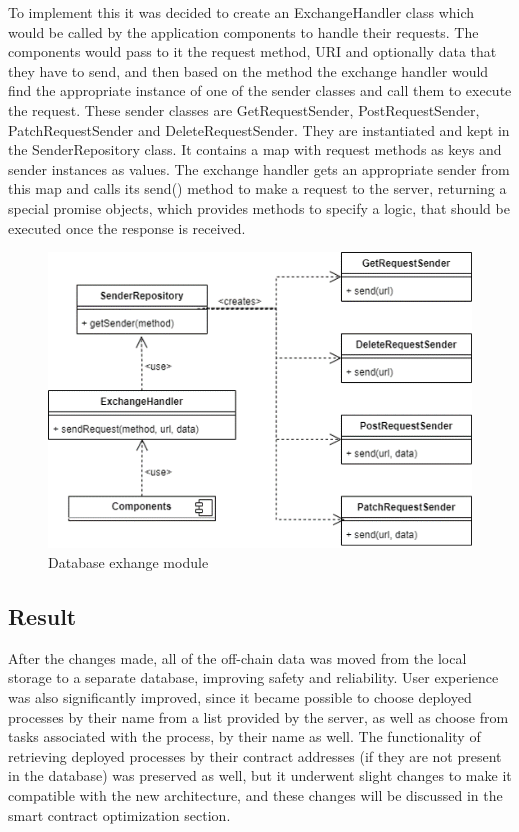 To implement this it was decided to create an ExchangeHandler class which would be called by the application components to handle their requests. The components would pass to it the request method, URI and optionally data that they have to send, and then based on the method the exchange handler would find the appropriate instance of one of the sender classes and call them to execute the request. These sender classes are GetRequestSender, PostRequestSender, PatchRequestSender and DeleteRequestSender. They are instantiated and kept in the SenderRepository class. It contains a map with request methods as keys and sender instances as values. The exchange handler gets an appropriate sender from this map and calls its send() method to make a request to the server, returning a special promise objects, which provides methods to specify a logic, that should be executed once the response is received.


\begin{figure}[htb]
	\includegraphics[width=\textwidth]{gfx/persistence_exchange}
	\caption{Database exhange module}
	\label{fig:impr:persistence:exchange}
\end{figure}

\subsection{Result}
\label{sec:impr:persistence:result}

After the changes made, all of the off-chain data was moved from the local storage to a separate database, improving safety and reliability. User experience was also significantly improved, since it became possible to choose deployed processes by their name from a list provided by the server, as well as choose from tasks associated with the process, by their name as well. The functionality of retrieving deployed processes by their contract addresses (if they are not present in the database) was preserved as well, but it underwent slight changes to make it compatible with the new architecture, and these changes will be discussed in the smart contract optimization section.

